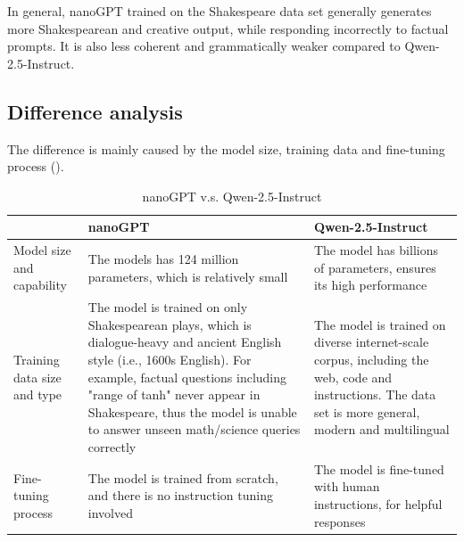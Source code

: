\documentclass{article} %
\begin{document}
In general, nanoGPT trained on the Shakespeare data set generally generates more Shakespearean and creative output, while responding incorrectly to factual prompts. It is also less coherent and grammatically weaker compared to Qwen-2.5-Instruct. 

\subsection{Difference analysis}
The difference is mainly caused by 
the model size, training data and fine-tuning process (\cite{radford2019language}).
\begin{table}[H]
  \centering
  \begin{tabular}{|p{3cm}|p{5cm}|p{5cm}|}
    \hline
    & nanoGPT& Qwen-2.5-Instruct\\ \hline
    Model size and capability& The models has 124 million parameters, which is relatively small& The model has billions of parameters, ensures its high performance\\ \hline
    Training data size and type& The model is trained on only Shakespearean plays, which is dialogue-heavy and ancient English style (i.e., 1600s English). For example, factual questions including "range of tanh" never appear in Shakespeare, thus the model is unable to answer unseen math/science queries correctly& The model is trained on diverse internet-scale corpus, including the web, code and instructions. The data set is more general, modern and multilingual\\ \hline
 Fine-tuning process& The model is trained from scratch, and there is no instruction tuning involved&The model is fine-tuned with human instructions, for helpful responses\\\hline
  \end{tabular}
  \caption{nanoGPT v.s. Qwen-2.5-Instruct}
  \label{tab:your_label}
\end{table}



\end{document}
